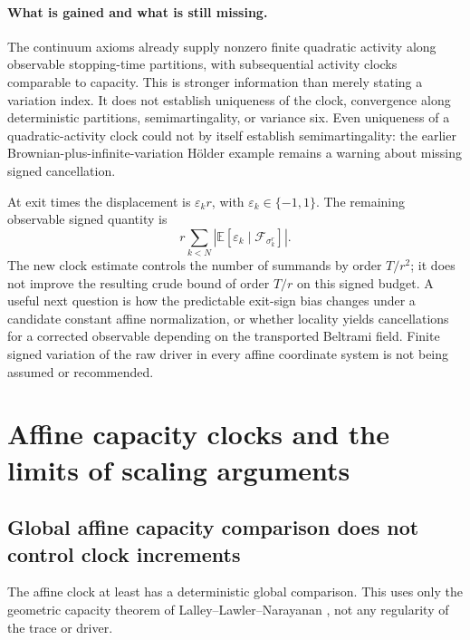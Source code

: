 \documentclass[11pt]{article}
\theoremstyle{definition}\newtheorem{definition}[theorem]{Definition}
\theoremstyle{remark}\newtheorem{remark}[theorem]{Remark}
\begin{document}
\paragraph{What is gained and what is still missing.}
The continuum axioms already supply nonzero finite quadratic activity
along observable stopping-time partitions, with subsequential activity
clocks comparable to capacity. This is stronger information than merely
stating a variation index. It does not establish uniqueness of the clock,
convergence along deterministic partitions, semimartingality, or variance
six. Even uniqueness of a quadratic-activity clock could not by itself
establish semimartingality: the earlier Brownian-plus-infinite-variation
H\"older example remains a warning about missing signed cancellation.

At exit times the displacement is $\varepsilon_kr$, with
$\varepsilon_k\in\{-1,1\}$. The remaining observable signed quantity is
\[
 r\sum_{k<N}\left|\mathbb E[\varepsilon_k
                         \mid\mathcal F_{\sigma^r_k}]\right|.
\]
The new clock estimate controls the number of summands by order $T/r^2$;
it does not improve the resulting crude bound of order $T/r$ on this
signed budget. A useful next question is how the predictable exit-sign
bias changes under a candidate constant affine normalization, or whether
locality yields cancellations for a corrected observable depending on
the transported Beltrami field. Finite signed variation of the raw driver
in every affine coordinate system is not being assumed or recommended.

\section{Affine capacity clocks and the limits of scaling arguments}
\label{sec:affine-clock-obstructions}

\subsection{Global affine capacity comparison does not control clock increments}
\label{sec:global-affine-capacity}

The affine clock at least has a deterministic global comparison. This
uses only the geometric capacity theorem of Lalley--Lawler--Narayanan
\cite[Theorem 1]{lln-capacity}, not any regularity of the trace or driver.
\end{document}
